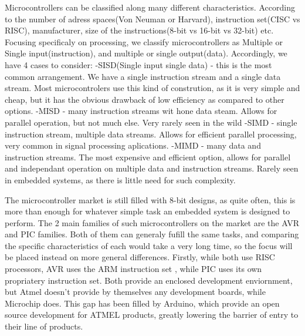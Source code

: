 \sol Microcontrollers can be classified along many different characteristics. According to the number of adress spaces(Von Neuman or Harvard),
    instruction set(CISC vs RISC), manufacturer, size of the instructions(8-bit vs 16-bit vs 32-bit) etc. Focusing specificaly on processing, we classify microcontrollers as Multiple or Single input(instruction), 
    and multiple or single output(data). Accordingly, we have 4 cases to consider: \newline
    -SISD(Single input single data) - this is the most common arrangement. We have a single instruction stream and a single data stream. Most microcontrolers use \newline
     this kind of constrution, as it is very simple and cheap, but it has the obvious drawback of low efficiency as compared to other options. \newline
    -MISD - many instruction streams wit hone data steam. Allows for parallel operation, but not much else. Very rarely seen in the wild \newline
    -SIMD - single instruction stream, multiple data streams. Allows for efficient parallel processing, very common in signal processing aplications. \newline
    -MIMD - many data and instruction streams. The most expensive and efficient option, allows for parallel and independant operation on multiple data and instruction streams. Rarely seen in embedded systems, as there is little need for such complexity. \newline
 \newline

    \sol The microcontroller market is still filled with 8-bit designs, as quite often, this is more than enough for whatever simple task
        an embedded system is designed to perform. The 2 main families of such microcontrollers on the market are the AVR and PIC families.
        Both of them can generaly fufill the same tasks, and comparing the specific characteristics of each would take a very long time, so 
        the focus will be placed instead on more general differences. Firstly, while both use RISC processors, AVR uses the ARM instruction set
        , while PIC uses its own propriatery instruction set. Both provide an enclosed development enviornment, but Atmel doesn't provide by 
        themselves any development boards, while Microchip does. This gap has been filled by Arduino, which provide an open source development
        for ATMEL products, greatly lowering the barrier of entry to their line of products.
 
